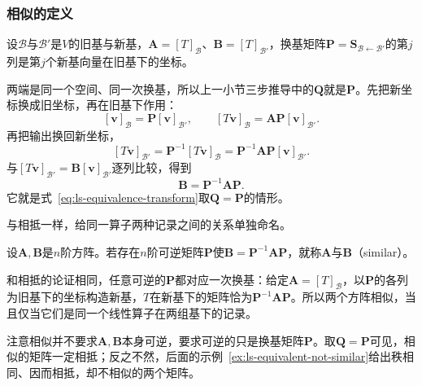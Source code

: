\subsubsection{相似的定义}
\label{sec:ls-similarity-definition}
设$\mathcal B$与$\mathcal B'$是$V$的旧基与新基，$\bm A=[T]_{\mathcal B}$、$\bm B=[T]_{\mathcal B'}$，换基矩阵$\bm P=\bm S_{\mathcal B\leftarrow\mathcal B'}$的第$j$列是第$j$个新基向量在旧基下的坐标。

两端是同一个空间、同一次换基，所以上一小节三步推导中的$\bm Q$就是$\bm P$。先把新坐标换成旧坐标，再在旧基下作用：
\[
 [\bm v]_{\mathcal B}=\bm P[\bm v]_{\mathcal B'},\qquad
 [T\bm v]_{\mathcal B}=\bm A\bm P[\bm v]_{\mathcal B'}.
\]
再把输出换回新坐标，
\[
 [T\bm v]_{\mathcal B'}=\bm P^{-1}[T\bm v]_{\mathcal B}=\bm P^{-1}\bm A\bm P[\bm v]_{\mathcal B'}.
\]
与$[T\bm v]_{\mathcal B'}=\bm B[\bm v]_{\mathcal B'}$逐列比较，得到
\begin{equation}
 \bm B=\bm P^{-1}\bm A\bm P.
 \label{eq:linear-algebra-similarity-change-basis}
\end{equation}
它就是式~\eqref{eq:ls-equivalence-transform}取$\bm Q=\bm P$的情形。

\label{sec:ls-similarity-meaning}%
与相抵一样，给同一算子两种记录之间的关系单独命名。
\begin{definition}[矩阵相似]
\label{def:ls-matrix-similarity}
设$\bm A,\bm B$是$n$阶方阵。若存在$n$阶可逆矩阵$\bm P$使$\bm B=\bm P^{-1}\bm A\bm P$，就称$\bm A$与$\bm B$（similar）。
\end{definition}
和相抵的论证相同，任意可逆的$\bm P$都对应一次换基：给定$\bm A=[T]_{\mathcal B}$，以$\bm P$的各列为旧基下的坐标构造新基，$T$在新基下的矩阵恰为$\bm P^{-1}\bm A\bm P$。所以两个方阵相似，当且仅当它们是同一个线性算子在两组基下的记录。

注意相似并不要求$\bm A,\bm B$本身可逆，要求可逆的只是换基矩阵$\bm P$。取$\bm Q=\bm P$可见，相似的矩阵一定相抵；反之不然，后面的示例~\ref{ex:ls-equivalent-not-similar}给出秩相同、因而相抵，却不相似的两个矩阵。

